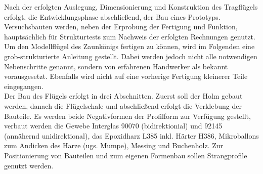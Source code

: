 Nach der erfolgten Auslegung, Dimensionierung und Konstruktion des Tragflügels erfolgt, die Entwicklungsphase abschließend, der Bau eines Prototyps. Versuchsbauten werden, neben der Erprobung der Fertigung und Funktion, hauptsächlich für Strukturtests zum Nachweis der erfolgten Rechnungen genutzt. Um den Modellflügel des Zaunkönigs fertigen zu können, wird im Folgenden eine grob-strukturierte Anleitung gestellt. Dabei werden jedoch nicht alle notwendigen Nebenschritte genannt, sondern von erfahrenen Handwerker als bekannt vorausgesetzt. Ebenfalls wird nicht auf eine vorherige Fertigung kleinerer Teile eingegangen.\\

\noindent Der Bau des Flügels erfolgt in drei Abschnitten. Zuerst soll der Holm gebaut werden, danach die Flügelschale und abschließend erfolgt die Verklebung der Bauteile.
Es werden beide Negativformen der Profilform zur Verfügung gestellt, verbaut werden die Gewebe Interglas 90070 (bidirektionial) und 92145 (annähernd unidirektional), das Epoxidharz L385 inkl. Härter H386, Mikroballons zum Andicken des Harze (ugs. Mumpe), Messing und Buchenholz. Zur Positionierung von Bauteilen und zum eigenen Formenbau sollen Strangprofile genutzt werden. 

